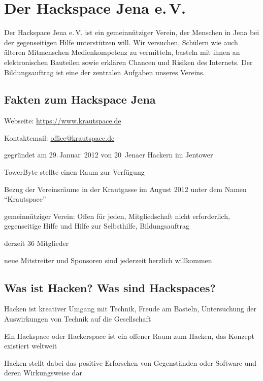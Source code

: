 \documentclass[a4paper,12pt,twoside]{scrartcl}
\begin{document}
\thispagestyle{empty}

\section*{Der Hackspace Jena e.\,V.}
Der Hackspace Jena e.\,V. ist ein gemeinnütziger Verein, der Menschen
in Jena bei der gegenseitigen Hilfe unterstützen will. Wir versuchen,
Schülern wie auch älteren Mitmenschen Medienkompetenz zu vermitteln,
basteln mit ihnen an elektronischen Bauteilen sowie erklären Chancen
und Risiken des Internets. Der Bildungsauftrag ist eine der zentralen
Aufgaben unseres Vereins.

\subsection*{Fakten zum Hackspace Jena}
\begin{compactitem}
\item Webseite: \url{https://www.krautspace.de}
\item Kontaktemail: \url{office@krautspace.de}
\item gegründet am 29.\,Januar~2012 von 20~Jenaer Hackern im Jentower
\item TowerByte stellte einen Raum zur Verfügung
\item Bezug der Vereinsräume in der Krautgasse im August 2012 unter
  dem Namen \enquote{Krautspace}
\item gemeinnütziger Verein: Offen für jeden, Mitgliedschaft nicht 
  erforderlich, gegenseitige Hilfe und Hilfe zur Selbsthilfe, 
  Bildungsauftrag
\item derzeit 36 Mitglieder
\item neue Mitstreiter und Sponsoren sind jederzeit herzlich willkommen
\end{compactitem}

\subsection*{Was ist Hacken? Was sind Hackspaces?}
\begin{compactitem}
\item Hacken ist kreativer Umgang mit Technik, Freude am Basteln, 
  Untersuchung der Auswirkungen von Technik auf die Gesellschaft
\item Ein Hackspace oder Hackerspace ist ein offener Raum zum Hacken, das 
  Konzept existiert weltweit
\item Hacken stellt dabei das positive Erforschen von Gegenständen oder 
  Software und deren Wirkungsweise dar
\end{compactitem}
\end{document}
